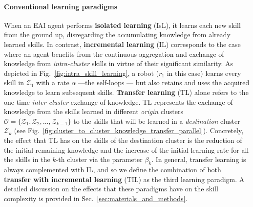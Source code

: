 \documentclass[12pt]{article}
\renewcommand{\emph}[1]{\textit{#1}}
\begin{document}
\paragraph*{Conventional learning paradigms} 
When an EAI agent performs \textbf{isolated learning} (IsL), it learns each new skill from the ground up, disregarding the accumulating knowledge from already learned skills. In contrast, \textbf{incremental learning} (IL) corresponds to the case where an agent benefits from the continuous aggregation and exchange of knowledge from \emph{intra-cluster} skills in virtue of their significant similarity. As depicted in Fig.~\ref{fig:intra_skill_learning}, a robot ($r_1$ in this case) learns every skill in $\mathcal{Z}_1$ with a rate $\alpha$ ---the self-loops --- but also retains and uses the acquired knowledge to learn subsequent skills. \textbf{Transfer learning} (TL) alone refers to the one-time \emph{inter-cluster} exchange of knowledge. TL represents the exchange of knowledge from the skills learned in different \emph{origin} clusters $\mathcal{O} = \{ \mathcal{Z}_1,\mathcal{Z}_2,\ldots,\mathcal{Z}_{k-1} \}$ to the skills that will be learned in a \emph{destination} cluster $\mathcal{Z}_k$ (see Fig.~\ref{fig:cluster_to_cluster_knowledge_transfer_parallel}). Concretely, the effect that TL has on the skills of the destination cluster is the reduction of the initial remaining knowledge and the increase of the initial learning rate for all the skills in the $k$-th cluster via the parameter $\beta_k$. In general, transfer learning is always complemented with IL, and so we define the combination of both \textbf{transfer with incremental learning} (TIL) as the third learning paradigm.  %
A detailed discussion on the effects that these paradigms have on the skill complexity is provided in Sec.~\ref{sec:materials_and_methods}.

\end{document}
